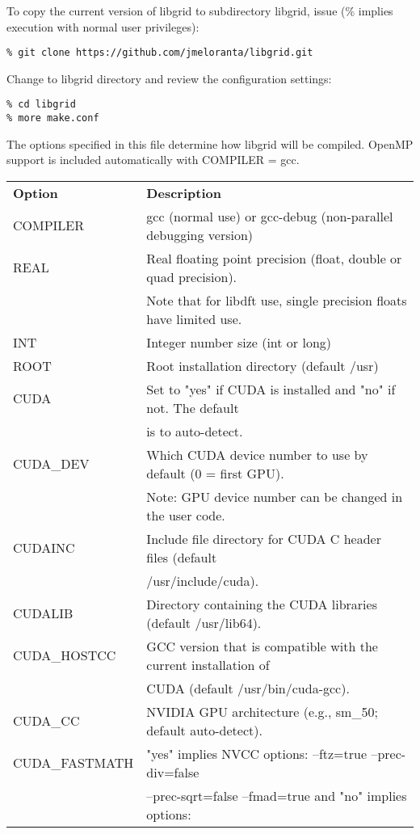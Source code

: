 \documentclass[12pt,letterpaper]{report}
\begin{document}
To copy the current version of libgrid to subdirectory libgrid, issue (\% implies execution with normal user privileges):
\begin{verbatim}
% git clone https://github.com/jmeloranta/libgrid.git
\end{verbatim}
Change to libgrid directory and review the configuration settings:
\begin{verbatim}
% cd libgrid
% more make.conf
\end{verbatim}
The options specified in this file determine how libgrid will be compiled. OpenMP support is included automatically with COMPILER = gcc.\\

\begin{tabular}{ll}
\textbf{Option} & \textbf{Description}\\
\cline{1-2}
COMPILER & gcc (normal use) or gcc-debug (non-parallel debugging version)\\
REAL & Real floating point precision (float, double or quad precision).\\
     & Note that for libdft use, single precision floats have limited use.\\
INT & Integer number size (int or long)\\
ROOT & Root installation directory (default /usr)\\
CUDA & Set to "yes" if CUDA is installed and "no" if not. The default\\
     & is to auto-detect.\\
CUDA\_DEV & Which CUDA device number to use by default (0 = first GPU).\\
          & Note: GPU device number can be changed in the user code.\\
CUDAINC & Include file directory for CUDA C header files (default\\
        & /usr/include/cuda).\\
CUDALIB & Directory containing the CUDA libraries (default /usr/lib64).\\
CUDA\_HOSTCC & GCC version that is compatible with the current installation of\\
             & CUDA (default /usr/bin/cuda-gcc).\\
CUDA\_CC & NVIDIA GPU architecture (e.g., sm\_50; default auto-detect).\\
CUDA\_FASTMATH & "yes" implies NVCC options: --ftz=true --prec-div=false\\
               & --prec-sqrt=false --fmad=true and "no" implies options:\\

\end{tabular}
\end{document}
